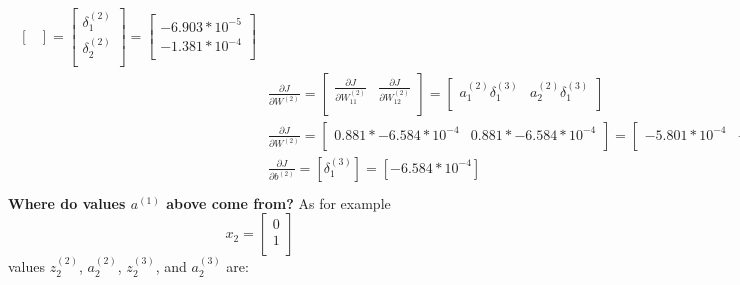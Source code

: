 \documentclass[leqno]{article}
\begin{document}
\begin{gather*}
\begin{split}
\begin{bmatrix}
  \end{bmatrix}
  =
 \begin{bmatrix}
   \delta_1^{(2)}\\ 
   \delta_2^{(2)}\\
  \end{bmatrix}
  =
  \begin{bmatrix}
   -6.903*10^{-5}\\ 
   -1.381*10^{-4}\\
  \end{bmatrix}
\\
&\frac{\partial J}{\partial W^{(2)}} = 
 \begin{bmatrix}
   \frac{\partial J}{\partial W_{11}^{(2)}} & \frac{\partial J}{\partial W_{12}^{(2)}}\\ 
  \end{bmatrix}
  =
 \begin{bmatrix}
   a_1^{(2)}\delta_1^{(3)} & a_2^{(2)}\delta_1^{(3)}\\ 
  \end{bmatrix}
\\
&\frac{\partial J}{\partial W^{(2)}}   =
  \begin{bmatrix}
   0.881*-6.584*10^{-4} & 0.881*-6.584*10^{-4}\\ 
  \end{bmatrix}
  =
  \begin{bmatrix}
   -5.801*10^{-4} & -5.801*10^{-4}\\
  \end{bmatrix}
\\
&\frac{\partial J}{\partial b^{(2)}} = [\delta_1^{(3)}] = [-6.584*10^{-4}]\\
\end{split}
\end{gather*}
\textbf{Where do values $a^{(1)}$ above come from?}
As for example
\[
x_2 =
  \begin{bmatrix}
  0\\
  1\\ 
  \end{bmatrix}
\]
values $z_2^{(2)}$, $a_2^{(2)}$, $z_2^{(3)}$, and $a_2^{(3)}$ are:
\end{document}
